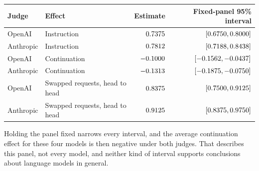 \begin{center}\small
\begin{tabular}{@{}llrr@{}}
\toprule
Judge & Effect & Estimate & Fixed-panel 95\% interval\\
\midrule
OpenAI & Instruction & $0.7375$ & $[0.6750, 0.8000]$\\
Anthropic & Instruction & $0.7812$ & $[0.7188, 0.8438]$\\
OpenAI & Continuation & $-0.1000$ & $[-0.1562, -0.0437]$\\
Anthropic & Continuation & $-0.1313$ & $[-0.1875, -0.0750]$\\
OpenAI & Swapped requests, head to head & $0.8375$ & $[0.7500, 0.9125]$\\
Anthropic & Swapped requests, head to head & $0.9125$ & $[0.8375, 0.9750]$\\
\bottomrule
\end{tabular}
\end{center}

Holding the panel fixed narrows every interval, and the average continuation
effect for these four models is then negative under both judges. That
describes this panel, not every model, and neither kind of interval supports
conclusions about language models in general.

